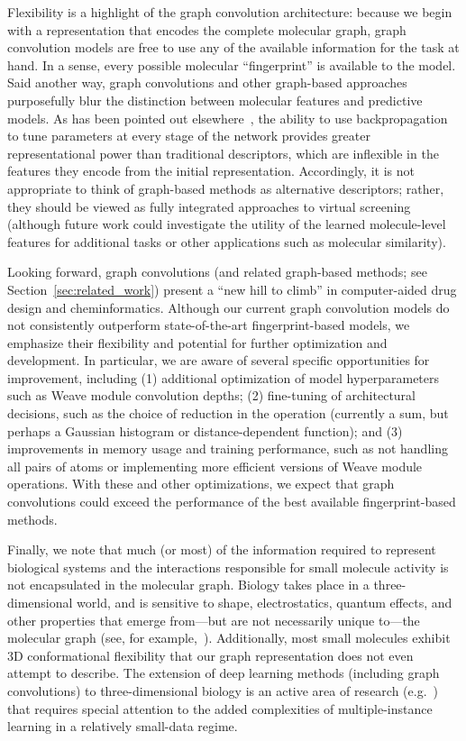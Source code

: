 Flexibility is a highlight of the graph
convolution architecture: because we begin with a representation that encodes
the complete molecular graph, graph convolution models are free to use any of
the available information for the task at hand. In a sense, every possible
molecular ``fingerprint'' is available to the model.
Said another way, graph convolutions and other graph-based approaches
purposefully blur the distinction between molecular features and predictive
models. As has been pointed out elsewhere~\citep{duvenaud2015convolutional}, the
ability to use backpropagation to tune parameters at every stage of the network
provides greater representational power than traditional descriptors, which are
inflexible in the features they encode from the initial representation.
Accordingly, it is not appropriate to think of graph-based methods as
alternative descriptors; rather, they should be viewed as fully integrated
approaches to virtual screening (although future work could investigate the
utility of the learned molecule-level features for additional tasks or other
applications such as molecular similarity).

Looking forward, graph convolutions (and related graph-based methods; see
Section~\ref{sec:related_work}) present a ``new hill to climb'' in
computer-aided drug design and cheminformatics. Although our current graph
convolution models do not consistently outperform state-of-the-art
fingerprint-based models, we emphasize their flexibility and potential for
further optimization and development. In particular, we are aware of several
specific opportunities for improvement, including (1) additional optimization of
model hyperparameters such as Weave module convolution depths; (2) fine-tuning
of architectural decisions, such as the choice of reduction in the  operation (currently a sum, but perhaps a Gaussian histogram or
distance-dependent function); and (3) improvements in memory usage and training
performance, such as not handling all pairs of atoms or implementing more
efficient versions of Weave module operations. With these and other
optimizations, we expect that graph convolutions could exceed the performance of
the best available fingerprint-based methods.

Finally, we note that much (or most) of the information required to represent
biological systems and the interactions responsible for small molecule activity
is not encapsulated in the molecular graph. Biology takes place in a
three-dimensional world, and is sensitive to shape, electrostatics, quantum
effects, and other properties that emerge from---but are not necessarily unique
to---the molecular graph (see, for example,~\citet{nicholls2010molecular}).
Additionally, most small molecules exhibit 3D conformational flexibility that
our graph representation does not even attempt to describe. The extension of
deep learning methods (including graph convolutions) to three-dimensional
biology is an active area of research (e.g.~\citet{wallach2015atomnet})
that requires special attention to the added complexities of multiple-instance
learning in a relatively small-data regime.



